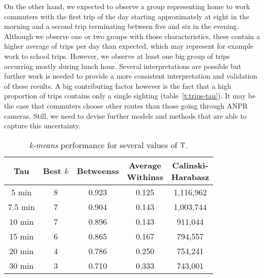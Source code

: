 On the other hand, we expected to observe a group representing home to work commuters with the first trip of the day starting approximately at eight in the morning and a second trip terminating between five and six in the evening. Although we observe one or two groups with those characteristics, these contain a higher average of trips per day than expected, which may represent for example work to school trips. However, we observe at least one big group of trips occurring mostly during lunch hour. Several interpretations are possible but further work is needed to provide a more consistent interpretation and validation of these results. A big contributing factor however is the fact that a high proportion of trips contains only a single sighting (table~\ref{t:trips-tau}). It may be the case that commuters choose other routes than those going through ANPR cameras. Still, we need to devise further models and methods that are able to capture this uncertainty.

\begin{table}[t]
\centering
\tabcolsep=0.17cm
\begin{tabular}{c c c c c}
  \hline
Tau & Best $k$ & Betweenss & \thead{Average\\Withinss} & \thead{Calinski-\\Harabasz} \\
  \hline
5 min &   8 & 0.923 & 0.125 & 1,116,962 \\
  7.5 min &   7 & 0.904 & 0.143 & 1,003,744 \\
  10 min&   7 & 0.896 & 0.143 &   911,044 \\
  15 min &   6 & 0.865 & 0.167 &   794,557 \\
  20 min &   4 & 0.786 & 0.250 &   754,241 \\
  30 min &   3 & 0.710 & 0.333 &   743,001 \\
   \hline
\end{tabular}
\caption{\emph{k-means} performance for several values of $\mathrm{T}$.}
\label{t:tau_comparison}
\end{table}

